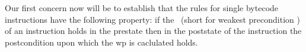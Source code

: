 


Our first concern now will  be to establish that the rules for single bytecode instructions have the following property:
 if the \fwpi \ (short for weakest precondition ) of an 
instruction holds in the prestate then in the poststate of the instruction the postcondition upon which the wp is caclulated holds. 


